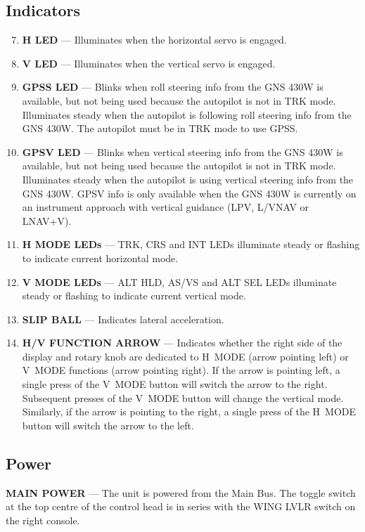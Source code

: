 \subsection*{Indicators} 
\begin{enumerate}
\setcounter{enumi}{6} 
\item \textbf{H LED} --- Illuminates when the horizontal servo is engaged. 
\item \textbf{V LED} --- Illuminates when the vertical servo is engaged. 
\item \textbf{GPSS LED} --- Blinks when roll steering info from the GNS 430W is available, but not being used because the autopilot is not in TRK mode. Illuminates steady when the autopilot is following roll steering info from the GNS 430W. The autopilot must be in TRK mode to use GPSS.
\item\textbf{GPSV LED} --- Blinks when vertical steering info from the GNS 430W is available, but not being used because the autopilot is not in TRK mode. Illuminates steady when the autopilot is using vertical steering info from the GNS 430W. GPSV info is only available when the GNS 430W is currently on an instrument approach with vertical guidance (LPV, L/VNAV or LNAV+V).
\item \textbf{H MODE LEDs} --- TRK, CRS and INT LEDs illuminate steady or flashing to indicate current horizontal mode.
\item \textbf{V MODE LEDs} --- ALT HLD, AS/VS and ALT SEL LEDs illuminate steady or flashing to indicate current vertical mode.
\item \textbf{SLIP BALL} --- Indicates lateral acceleration. 
\item \textbf{H/V FUNCTION ARROW} --- Indicates whether the right side of the display and rotary knob are dedicated to H~MODE (arrow pointing left) or V~MODE functions (arrow pointing right).  If the arrow is pointing left, a single press of the V~MODE button will switch the arrow to the right.  Subsequent presses of the V~MODE button will change the vertical mode.  Similarly, if the arrow is pointing to the right, a single press of the H~MODE button will switch the arrow to the left.
\end{enumerate}

\subsection*{Power}

\textbf{MAIN POWER} --- The unit is powered from the Main Bus. The toggle switch at the top centre of the control head is in series with the WING LVLR switch on the right console.

